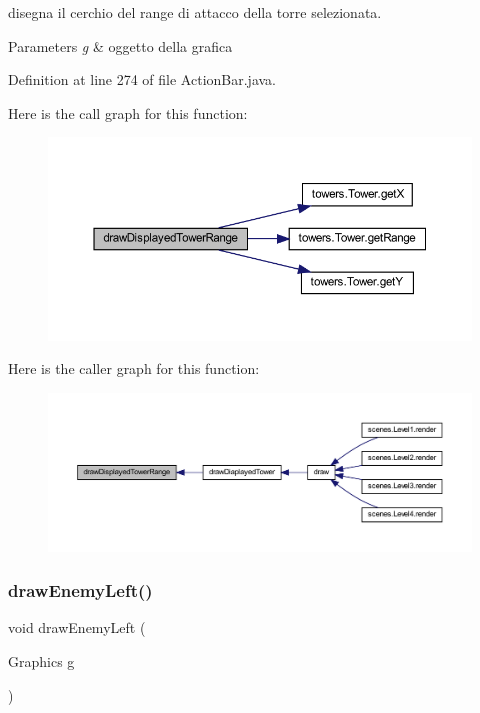 disegna il cerchio del range di attacco della torre selezionata. 


\begin{DoxyParams}{Parameters}
{\em g} & oggetto della grafica \\
\hline
\end{DoxyParams}


Definition at line 274 of file Action\+Bar.\+java.

Here is the call graph for this function\+:\nopagebreak
\begin{figure}[H]
\begin{center}
\leavevmode
\includegraphics[width=350pt]{classui_1_1_action_bar_a1f012512b669e57c49c1957905a35107_cgraph}
\end{center}
\end{figure}
Here is the caller graph for this function\+:\nopagebreak
\begin{figure}[H]
\begin{center}
\leavevmode
\includegraphics[width=350pt]{classui_1_1_action_bar_a1f012512b669e57c49c1957905a35107_icgraph}
\end{center}
\end{figure}
\mbox{\label{classui_1_1_action_bar_abb1fa26db5a1c2f4b0776a316ad85249}} 
\subsubsection{\texorpdfstring{draw\+Enemy\+Left()}{drawEnemyLeft()}}
{\footnotesize\ttfamily void draw\+Enemy\+Left (\begin{DoxyParamCaption}\item[{Graphics}]{g }\end{DoxyParamCaption})\hspace{0.3cm}{\ttfamily [private]}}



